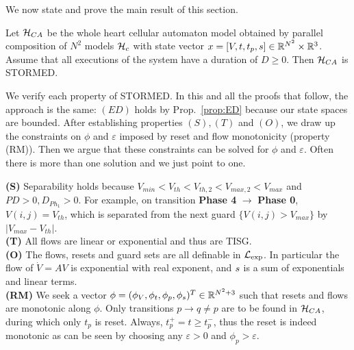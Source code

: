 We now state and prove the main result of this section.
\begin{thm}
	Let $\mathcal{H}_{CA}$ be the whole heart cellular automaton model obtained by parallel composition of $N^2$ models $\mathcal{H}_c$ with state vector $x = [V, t,t_p,s ] \in \mathbb{R}^{N^2}\times \mathbb{R}^{3}$.
	Assume that all executions of the system have a duration of $D\geq 0$.
	Then $\mathcal{H}_{CA}$ is STORMED.
\end{thm}
\begin{prf}
	We verify each property of STORMED.
In this and all the proofs that follow, the approach is the same: $(ED)$ holds by Prop.~\ref{prop:ED} because our state spaces are bounded.
After establishing properties $(S), (T)$ and $(O)$, we draw up the constraints on $\phi$ and $\varepsilon$ imposed by reset and flow monotonicity (property (RM)). 
Then we argue that these constraints can be solved for $\phi$ and $\varepsilon$.
Often there is more than one solution and we just point to one.

\textbf{(S)} Separability holds because $V_{min} < V_{th}< V_{th,2} < V_{max,2} < V_{max}$ and $PD>0,D_{Ph_1}>0$. 
For example, on transition \textbf{Phase 4} $\rightarrow$ \textbf{Phase 0}, $V(i,j)=V_{th}$, which is separated from the next guard $\{V(i,j) > V_{max}\}$ by $|V_{max}-V_{th}|$.
\\
\textbf{(T)} All flows are linear or exponential and thus are TISG.
\\
\textbf{(O)} The flows, resets and guard sets are all definable in $\mathcal{L}_{\exp}$.
In particular the flow of $\dot{V} = AV$ is exponential with real exponent, and $s$ is a sum of exponentials and linear terms.
\\
\textbf{(RM)}
We seek a vector $\phi = (\phi_V,\phi_t,\phi_p,\phi_s)^T \in \mathbb{R}^{N^2+3}$ such that resets and flows are monotonic along $\phi$.
Only transitions $p \rightarrow q \neq p$ are to be found in $\mathcal{H}_{CA}$, during which only $t_p$ is reset. 
Always, $t_p^+ = t \geq t_p^-$, thus the reset is indeed monotonic as can be seen by choosing any $\varepsilon >0$ and $\phi_p > \varepsilon$.


\end{prf}
